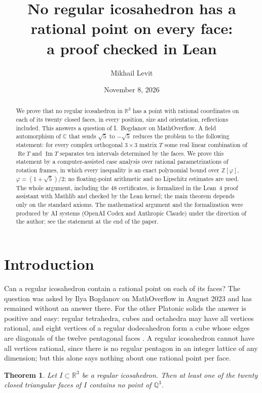 \documentclass[11pt]{article}
\title{No regular icosahedron has a rational point on every face:\\ a proof checked in Lean}
\author{Mikhail Levit}
\date{November 8, 2026}
\newtheorem{theorem}{Theorem}[section]
\theoremstyle{definition}
\theoremstyle{remark}
\newcommand{\R}{\mathbb{R}}
\newcommand{\Q}{\mathbb{Q}}
\newcommand{\C}{\mathbb{C}}
\newcommand{\Z}{\mathbb{Z}}
\newcommand{\re}{\operatorname{Re}}
\newcommand{\im}{\operatorname{Im}}
\begin{document}
\maketitle

\begin{abstract}
We prove that no regular icosahedron in $\R^3$ has a point with rational coordinates on each of its
twenty closed faces, in every position, size and orientation, reflections included. This answers a
question of I.~Bogdanov on MathOverflow. A field automorphism of $\C$ that sends $\sqrt5$ to
$-\sqrt5$ reduces the problem to the following statement: for every complex orthogonal $3\times3$
matrix $T$ some real linear combination of $\re T$ and $\im T$ separates ten intervals determined by
the faces. We prove this statement by a computer-assisted case analysis over rational
parametrizations of rotation frames, in which every inequality is an exact polynomial bound over
$\Z[\varphi]$, $\varphi=(1+\sqrt5)/2$; no floating-point arithmetic and no Lipschitz estimates are
used. The whole argument, including the $48$ certificates, is formalized in the Lean~4 proof
assistant with Mathlib and checked by the Lean kernel; the main theorem depends only on the
standard axioms. The mathematical argument and the formalization were produced by AI systems
(OpenAI Codex and Anthropic Claude) under the direction of the author; see the statement at the end of
the paper.
\end{abstract}

\section{Introduction}

Can a regular icosahedron contain a rational point on each of its faces? The question was asked
by Ilya Bogdanov on MathOverflow in August 2023 \cite{Bogdanov} and has remained without an answer
there. For the other Platonic solids the answer is positive and easy: regular tetrahedra, cubes and
octahedra may have all vertices rational, and eight vertices of a regular dodecahedron form a cube
whose edges are diagonals of the twelve pentagonal faces \cite{Bogdanov}. A regular icosahedron
cannot have all vertices rational, since there is no regular pentagon in an integer lattice of any
dimension; but this alone says nothing about one rational point per face.

\begin{theorem}\label{thm:main}
Let $I\subset\R^3$ be a regular icosahedron. Then at least one of the twenty closed triangular faces
of $I$ contains no point of $\Q^3$.
\end{theorem}
\end{document}

